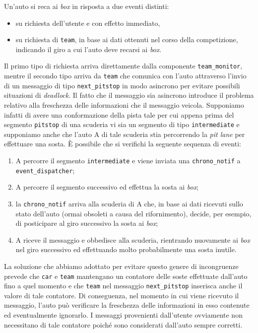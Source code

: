 \documentclass[a4paper]{report}
\newcommand{\fun}[1]{\texttt{#1}}
\begin{document}
Un'auto si reca ai \textit{box} in risposta a due eventi distinti:
\begin{itemize}
\item su richiesta dell'utente e con effetto immediato,
\item su richiesta di \texttt{team}, in base ai dati ottenuti nel corso della competizione, indicando il giro a cui l'auto deve recarsi ai \textit{box}.
\end{itemize}

Il primo tipo di richiesta arriva direttamente dalla componente \texttt{team\_monitor}, mentre il secondo tipo arriva da \texttt{team} che comunica con l'auto attraverso l'invio di un messaggio di tipo \texttt{next\_pitstop} in modo asincrono per evitare possibili situazioni di \textit{deadlock}. Il fatto che il messaggio sia asincrono introduce il problema relativo alla freschezza delle informazioni che il messaggio veicola. Supponiamo infatti di avere una conformazione della pista tale per cui appena prima del segmento \texttt{pitstop} di una scuderia vi sia un segmento di tipo \texttt{intermediate} e supponiamo anche che l'auto A di tale scuderia stia percorrendo la \textit{pit lane} per effettuare una sosta.
\`E possibile che si verifichi la seguente sequenza di eventi:
\begin{enumerate}
\item A percorre il segmento \texttt{intermediate} e viene inviata una \texttt{chrono\_notif} a \texttt{event\_dispatcher};
\item A percorre il segmento successivo ed effettua la sosta ai \textit{box};
\item la \texttt{chrono\_notif} arriva alla scuderia di A che, in base ai dati ricevuti sullo stato dell'auto (ormai obsoleti a causa del rifornimento), decide, per esempio, di posticipare al giro successivo la sosta ai \textit{box};
\item A riceve il messaggio e obbedisce alla scuderia, rientrando nuovamente ai \textit{box} nel giro successivo ed effettuando molto probabilmente una sosta inutile.
\end{enumerate}

La soluzione che abbiamo adottato per evitare questo genere di incongruenze prevede che \texttt{car} e \texttt{team} mantengano un contatore delle soste effettuate dall'auto fino a quel momento e che \texttt{team} nel messaggio \fun{next\_pitstop} inserisca anche il valore di tale contatore. Di conseguenza, nel momento in cui viene ricevuto il messaggio, l'auto può verificare la freschezza delle informazioni in esso contenute ed eventualmente ignorarlo. I messaggi provenienti dall'utente ovviamente non necessitano di tale contatore poiché sono considerati dall'auto sempre corretti.
\end{document}
